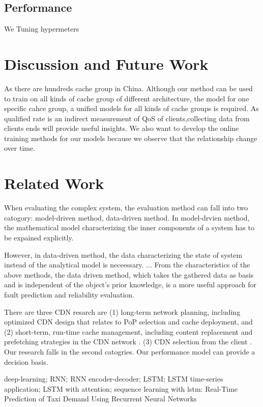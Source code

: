 \documentclass[5p]{elsarticle}
\begin{document}
\subsection{Performance}
We Tuning hypermeters

\section{Discussion and Future Work}
As there are hundreds cache group in China. Although our method can be used to train on all kinds of cache group of different architecture, the model for one specific cahce group, a unified models for all kinds of cache groups is required. As qualified rate is an indirect measurement of QoS of clients,collecting data from clients ends will provide useful insights. We also want to develop the online training methods for our models because we observe that the relationship change over time.
\section{Related Work}


When evaluating the complex system, the evaluation method can fall into two catogory: model-driven method, data-driven method. In model-drvien method, the mathematical model characterizing the inner components of a system has to be expained explicitly. 

However, in data-driven method, the data characterizing the state of system instead of the analytical model is neceessary. \cite{Jiang2017Pytheas}.\cite{Mao2017NeuralPensieve}.\cite{c}. From the characteristics of the above methods, the data driven method, which takes the gathered data as basis and is independent of the object’s prior knowledge, is a more useful approach for fault prediction and reliability evaluation.

There are three CDN resarch are (1) long-term network planning, including optimized CDN design that relates to PoP selection and cache deployment, and (2) short-term, run-time cache management, including content replacement and prefetching strategies in the CDN network \cite{Rethinking_CDN}. (3) CDN selection from the client\cite{Jiang2017Pytheas:Exploration-Exploitation} \cite{CFA}. Our research falls in the second catogries. Our performance model can provide a decision basis.

deep-learning; RNN; RNN encoder-decoder; LSTM; LSTM time-series application; LSTM with attention; sequence learning with lstm:
Real-Time Prediction of Taxi Demand Using Recurrent Neural Networks
\end{document}

